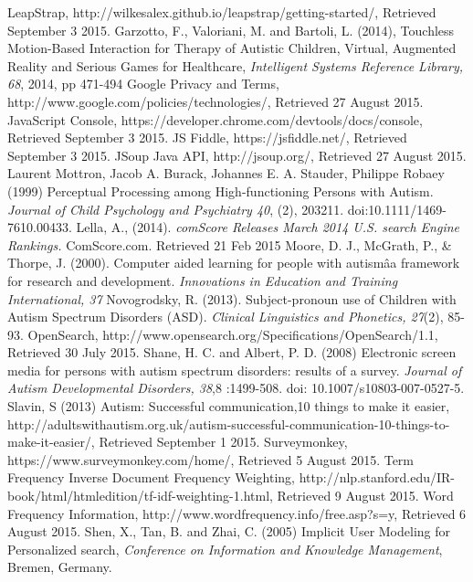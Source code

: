 \documentclass[a4paper, 11pt]{article}
\begin{document}
\begin{thebibliography}{100}
 LeapStrap, http://wilkesalex.github.io/leapstrap/getting-started/, Retrieved September 3 2015.
 Garzotto, F., Valoriani, M. and Bartoli, L. (2014), Touchless Motion-Based Interaction for Therapy of Autistic Children, Virtual, Augmented Reality and Serious Games for Healthcare, \textit{Intelligent Systems Reference Library, 68}, 2014, pp 471-494
 Google Privacy and Terms, http://www.google.com/policies/technologies/, Retrieved 27 August 2015.
 JavaScript Console, https://developer.chrome.com/devtools/docs/console, Retrieved September 3 2015.
 JS Fiddle, https://jsfiddle.net/, Retrieved September 3 2015.
 JSoup Java API, http://jsoup.org/, Retrieved 27 August 2015.
Laurent Mottron, Jacob A. Burack, Johannes E. A. Stauder, Philippe Robaey (1999) Perceptual Processing among High-functioning Persons with Autism. \textit{Journal of Child Psychology and Psychiatry 40}, (2), 203211. doi:10.1111/1469-7610.00433.
Lella, A., (2014). \textit{comScore Releases March 2014 U.S. search Engine Rankings.} ComScore.com. Retrieved 21 Feb 2015
Moore, D. J., McGrath, P., \& Thorpe, J. (2000). Computer aided learning for people with autismâa framework for research and development. \textit{Innovations in Education and Training International, 37}
 Novogrodsky, R. (2013). Subject-pronoun use of Children with Autism Spectrum Disorders (ASD). \textit{Clinical Linguistics and Phonetics, 27}(2), 85-93. 
OpenSearch, http://www.opensearch.org/Specifications/OpenSearch/1.1, Retrieved 30 July 2015.
Shane, H. C. and Albert, P. D. (2008) Electronic screen media for persons with autism spectrum disorders: results of a survey. \textit{Journal of Autism Developmental Disorders, 38},8 :1499-508. doi: 10.1007/s10803-007-0527-5.
 Slavin, S (2013) Autism: Successful communication,10 things to make it easier, http://adultswithautism.org.uk/autism-successful-communication-10-things-to-make-it-easier/, Retrieved September 1 2015.
Surveymonkey, https://www.surveymonkey.com/home/, Retrieved 5 August 2015.
 Term Frequency Inverse Document Frequency Weighting, http://nlp.stanford.edu/IR-book/html/htmledition/tf-idf-weighting-1.html, Retrieved 9 August 2015.
 Word Frequency Information, http://www.wordfrequency.info/free.asp?s=y, Retrieved 6 August 2015.
Shen, X., Tan, B. and Zhai, C. (2005) Implicit User Modeling for Personalized search, \textit{Conference on Information and Knowledge Management}, Bremen, Germany.
\end{thebibliography}
\end{document}
